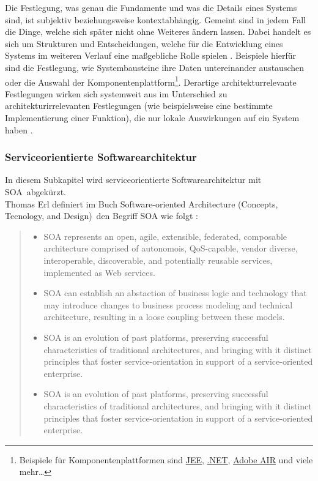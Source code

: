Die Festlegung, was genau die Fundamente und was die Details eines Systems sind, ist subjektiv beziehungsweise kontextabhängig. Gemeint sind in jedem Fall die Dinge, welche sich später nicht ohne Weiteres ändern lassen. Dabei handelt es sich um Strukturen und Entscheidungen, welche für die Entwicklung eines Systems im weiteren Verlauf eine maßgebliche Rolle spielen \citereset \autocite{Fowler.2005}. Beispiele hierfür sind die Festlegung, wie Systembausteine ihre Daten untereinander austauschen oder die Auswahl der Komponentenplattform\footnote{Beispiele für Komponentenplattformen sind \href{http://www.oracle.com/technetwork/java/javaee}{JEE}, \href{http://www.microsoft.com/net}{.NET}, \href{http://www.adobe.com/at/products/air.html}{Adobe AIR} und viele mehr\ldots }. Derartige architekturrelevante Festlegungen wirken sich systemweit aus im Unterschied zu architekturirrelevanten Festlegungen (wie beispielsweise eine bestimmte Implementierung einer Funktion), die nur lokale Auswirkungen auf ein System haben \citereset \autocite{Bredemeyer.Malan.2004}.

\subsubsection{Serviceorientierte Softwarearchitektur}
\label{sec:2_Serviceorientierte_Softwarearchitektur}
In diesem Subkapitel wird serviceorientierte Softwarearchitektur mit \glqq SOA\grqq\ abgekürzt.\\

Thomas Erl definiert im Buch \glqq Software-oriented Architecture (Concepts, Tecnology, and Design)\grqq\ den Begriff SOA wie folgt :
\begin{quote}
\glqq
\begin{itemize}
\item SOA represents an open, agile, extensible, federated, composable architecture comprised of autonomois, QoS-capable, vendor diverse, interoperable, discoverable, and potentially reusable services, implemented as Web services.
\item SOA can establish an abstaction of business logic and technology that may introduce changes to business process modeling and technical architecture, resulting in a loose coupling between these models.
\item SOA is an evolution of past platforms, preserving successful characteristics of traditional architectures, and bringing with it distinct principles that foster service-orientation in support of a service-oriented enterprise.
\item SOA is an evolution of past platforms, preserving successful characteristics of traditional architectures, and bringing with it distinct principles that foster service-orientation in support of a service-oriented enterprise.
\grqq
\end{itemize}
\end{quote}

